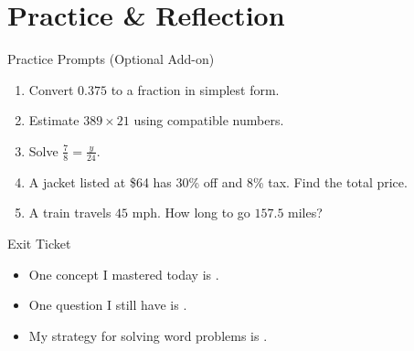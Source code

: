 \documentclass[aspectratio=169]{beamer}
\begin{document}
\section{Practice \& Reflection}

\begin{frame}{Practice Prompts (Optional Add-on)}
\begin{enumerate}
  \item Convert \(0.375\) to a fraction in simplest form.
  \item Estimate \(389\times 21\) using compatible numbers.
  \item Solve \(\frac{7}{8} = \frac{y}{24}\).
  \item A jacket listed at \$64 has 30\% off and 8\% tax. Find the total price.
  \item A train travels \(45\) mph. How long to go \(157.5\) miles?
\end{enumerate}
\end{frame}

\begin{frame}{Exit Ticket}
\begin{itemize}
  \item One concept I mastered today is \underline{\hspace{4cm}}.
  \item One question I still have is \underline{\hspace{4cm}}.
  \item My strategy for solving word problems is \underline{\hspace{4cm}}.
\end{itemize}
\end{frame}
\end{document}
